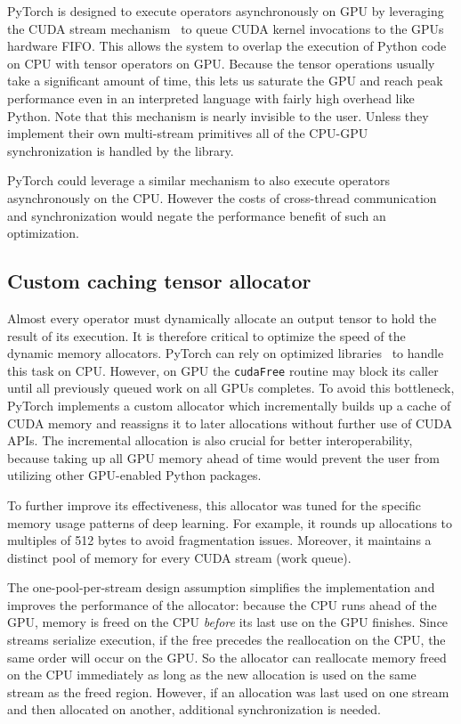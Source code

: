 PyTorch is designed to execute operators asynchronously on GPU by leveraging the CUDA stream mechanism~\cite{cuda_stream} to queue CUDA kernel invocations to the GPUs hardware FIFO. This allows the system to overlap the execution of Python code on CPU with tensor operators on GPU. 
Because the tensor operations usually take a significant amount of time, this lets us saturate the GPU and reach peak performance even in an interpreted language with fairly high overhead like Python.
Note that this mechanism is nearly invisible to the user. Unless they implement their own multi-stream primitives all of the CPU-GPU synchronization is handled by the library.

PyTorch could leverage a similar mechanism to also execute operators asynchronously on the CPU. However the costs of cross-thread communication and synchronization would negate the performance benefit of such an optimization.



\subsection{Custom caching tensor allocator}

Almost every operator must dynamically allocate an output tensor to hold the result of its execution. It is therefore critical to optimize the speed of the dynamic memory allocators. PyTorch can rely on optimized libraries~\cite{hoard, jemalloc, tcmalloc} to handle this task on CPU. However, on GPU the \lstinline{cudaFree} routine may block its caller until all previously queued work on all GPUs completes. To avoid this bottleneck, PyTorch implements a custom allocator which incrementally builds up a cache of CUDA memory and reassigns it to later allocations without further use of CUDA APIs.
The incremental allocation is also crucial for better interoperability, because taking up all GPU memory ahead of time would prevent the user from utilizing other GPU-enabled Python packages.

To further improve its effectiveness, this allocator was tuned for the specific memory usage patterns of deep learning. For example, it rounds up allocations to multiples of 512 bytes to avoid fragmentation issues. Moreover, it maintains a distinct pool of memory for every CUDA stream (work queue).

The one-pool-per-stream design assumption simplifies the implementation and improves the performance of the allocator: because the CPU runs ahead of the GPU, memory is freed on the CPU \textit{before} its last use on the GPU finishes. Since streams serialize execution, if the free precedes the reallocation on the CPU, the same order will occur on the GPU. So the allocator can reallocate memory freed on the CPU immediately as long as the new allocation is used on the same stream as the freed region. However, if an allocation was last used on one stream and then allocated on another, additional synchronization is needed.

